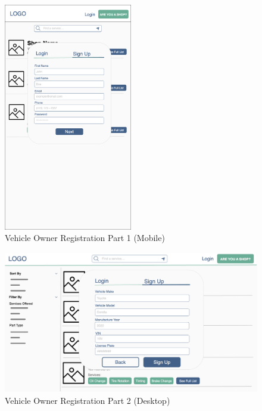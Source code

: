 \documentclass[12pt, titlepage]{article}
\begin{document}
\begin{figure}[H]
	\centering
	\includegraphics[width=0.5\textwidth]{mockups/Vehicle Owner Sign Up (Part 1) (Mobile).png}
	\caption{Vehicle Owner Registration \textemdash{} Part 1 (Mobile)}
\end{figure}

\begin{figure}[H]
	\centering
	\includegraphics[width=\textwidth]{mockups/Vehicle Owner Sign Up (Part 2) (Desktop).png}
	\caption{Vehicle Owner Registration \textemdash{} Part 2 (Desktop)}
\end{figure}
\end{document}
